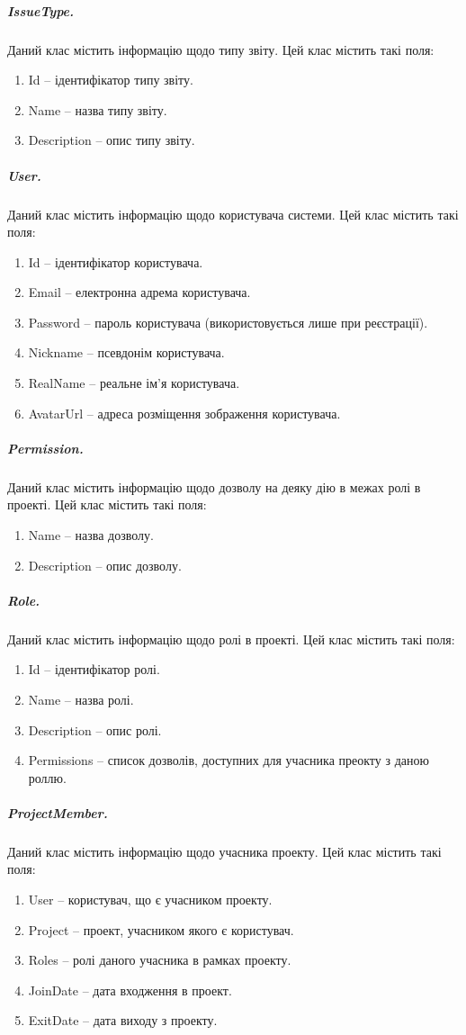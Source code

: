 \documentclass[../main.tex]{subfiles}
\begin{document}
		\subparagraph{IssueType.}
			Даний клас містить інформацію щодо типу звіту. Цей клас містить такі поля:
			\begin{enumerate}
				\item Id -- ідентифікатор типу звіту.
				\item Name -- назва типу звіту.
				\item Description -- опис типу звіту.
			\end{enumerate}

		\subparagraph{User.}
			Даний клас містить інформацію щодо користувача системи. Цей клас містить такі поля:
			\begin{enumerate}
				\item Id -- ідентифікатор користувача.
				\item Email -- електронна адрема користувача.
				\item Password -- пароль користувача (використовується лише при реєстрації).
				\item Nickname -- псевдонім користувача.
				\item RealName -- реальне ім'я користувача.
				\item AvatarUrl -- адреса розміщення зображення користувача.
			\end{enumerate}

		\subparagraph{Permission.}
			Даний клас містить інформацію щодо дозволу на деяку дію в межах ролі в проекті. Цей клас містить такі поля:
			\begin{enumerate}
				\item Name -- назва дозволу.
				\item Description -- опис дозволу.
			\end{enumerate}

		\subparagraph{Role.}
			Даний клас містить інформацію щодо ролі в проекті. Цей клас містить такі поля:
			\begin{enumerate}
				\item Id -- ідентифікатор ролі.
				\item Name -- назва ролі.
				\item Description -- опис ролі.
				\item Permissions -- список дозволів, доступних для учасника преокту з даною роллю.
			\end{enumerate}

		\subparagraph{ProjectMember.}
			Даний клас містить інформацію щодо учасника проекту. Цей клас містить такі поля:
			\begin{enumerate}
				\item User -- користувач, що є учасником проекту.
				\item Project -- проект, учасником якого є користувач.
				\item Roles -- ролі даного учасника в рамках проекту.
				\item JoinDate -- дата входження в проект.
				\item ExitDate -- дата виходу з проекту.
			\end{enumerate}
\end{document}
